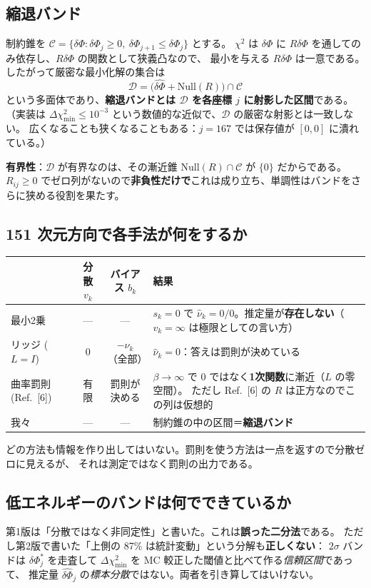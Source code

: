 \documentclass[11pt,a4paper]{ltjsarticle}
\newcommand{\dP}{\delta\Phi}
\newcommand{\dPh}{\widehat{\delta\Phi}}
\begin{document}
\subsection{縮退バンド}
制約錐を $\mathcal{C}=\{\dP:\dP_j\ge0,\ \dP_{j+1}\le\dP_j\}$ とする。
$\chi^2$ は $\dP$ に $R\dP$ を通してのみ依存し、$R\dP$ の関数として狭義凸なので、
最小を与える $R\dP$ は一意である。したがって厳密な最小化解の集合は
\begin{equation}
\mathcal{D}=\big(\dPh+\mathrm{Null}(R)\big)\cap\mathcal{C}
\end{equation}
という多面体であり、\textbf{縮退バンドとは $\mathcal{D}$ を各座標 $j$ に射影した区間}である。
（実装は $\Delta\chi^2_{\min}\le10^{-3}$ という数値的な近似で、$\mathcal{D}$ の厳密な射影とは一致しない。
広くなることも狭くなることもある：$j=167$ では保存値が $[0,0]$ に潰れている。）

\textbf{有界性}：$\mathcal{D}$ が有界なのは、その漸近錐 $\mathrm{Null}(R)\cap\mathcal{C}$ が $\{0\}$ だからである。
$R_{ij}\ge0$ でゼロ列がないので\textbf{非負性だけで}これは成り立ち、単調性はバンドをさらに狭める役割を果たす。

\subsection{151 次元方向で各手法が何をするか}
\begin{center}\small
\begin{tabular}{lccp{}}
\toprule
 & 分散 $v_k$ & バイアス $b_k$ & 結果 \\
\midrule
最小2乗 & --- & --- & $s_k=0$ で $\hat\nu_k=0/0$。推定量が\textbf{存在しない}（$v_k=\infty$ は極限としての言い方）\\[2pt]
リッジ ($L=I$) & $0$ & $-\nu_k$（全部） & $\hat\nu_k=0$：答えは罰則が決めている \\[2pt]
曲率罰則 (Ref.~[6]) & 有限 & 罰則が決める & $\beta\to\infty$ で 0 ではなく\textbf{1次関数}に漸近（$L$ の零空間）。
ただし Ref.~[6] の $R$ は正方なのでこの列は仮想的 \\[2pt]
我々 & --- & --- & 制約錐の中の区間＝\textbf{縮退バンド} \\
\bottomrule
\end{tabular}
\end{center}
どの方法も情報を作り出してはいない。罰則を使う方法は一点を返すので分散ゼロに見えるが、
それは測定ではなく罰則の出力である。

\subsection{低エネルギーのバンドは何でできているか}
第1版は「分散ではなく非同定性」と書いた。これは\textbf{誤った二分法}である。
ただし第2版で書いた「上側の 87\% は統計変動」という分解も\textbf{正しくない}：
$2\sigma$ バンドは $\dP_j^*$ を走査して $\Delta\chi^2_{\min}$ を MC 較正した閾値と比べて作る\emph{信頼区間}であって、
推定量 $\dPh_j$ の\emph{標本分散}ではない。両者を引き算してはいけない。
\end{document}
